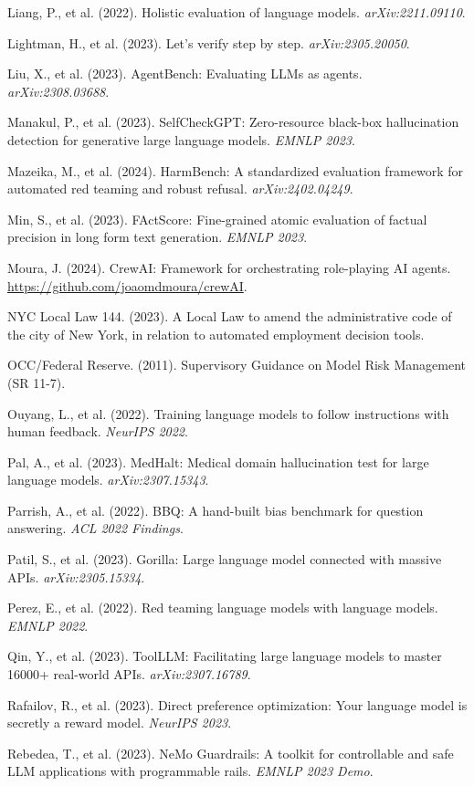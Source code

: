 \documentclass[
]{article}
\begin{document}
Liang, P., et al. (2022). Holistic evaluation of language models. \emph{arXiv:2211.09110}.

Lightman, H., et al. (2023). Let's verify step by step. \emph{arXiv:2305.20050}.

Liu, X., et al. (2023). AgentBench: Evaluating LLMs as agents. \emph{arXiv:2308.03688}.

Manakul, P., et al. (2023). SelfCheckGPT: Zero-resource black-box hallucination detection for generative large language models. \emph{EMNLP 2023}.

Mazeika, M., et al. (2024). HarmBench: A standardized evaluation framework for automated red teaming and robust refusal. \emph{arXiv:2402.04249}.

Min, S., et al. (2023). FActScore: Fine-grained atomic evaluation of factual precision in long form text generation. \emph{EMNLP 2023}.

Moura, J. (2024). CrewAI: Framework for orchestrating role-playing AI agents. \url{https://github.com/joaomdmoura/crewAI}.

NYC Local Law 144. (2023). A Local Law to amend the administrative code of the city of New York, in relation to automated employment decision tools.

OCC/Federal Reserve. (2011). Supervisory Guidance on Model Risk Management (SR 11-7).

Ouyang, L., et al. (2022). Training language models to follow instructions with human feedback. \emph{NeurIPS 2022}.

Pal, A., et al. (2023). MedHalt: Medical domain hallucination test for large language models. \emph{arXiv:2307.15343}.

Parrish, A., et al. (2022). BBQ: A hand-built bias benchmark for question answering. \emph{ACL 2022 Findings}.

Patil, S., et al. (2023). Gorilla: Large language model connected with massive APIs. \emph{arXiv:2305.15334}.

Perez, E., et al. (2022). Red teaming language models with language models. \emph{EMNLP 2022}.

Qin, Y., et al. (2023). ToolLLM: Facilitating large language models to master 16000+ real-world APIs. \emph{arXiv:2307.16789}.

Rafailov, R., et al. (2023). Direct preference optimization: Your language model is secretly a reward model. \emph{NeurIPS 2023}.

Rebedea, T., et al. (2023). NeMo Guardrails: A toolkit for controllable and safe LLM applications with programmable rails. \emph{EMNLP 2023 Demo}.
\end{document}
